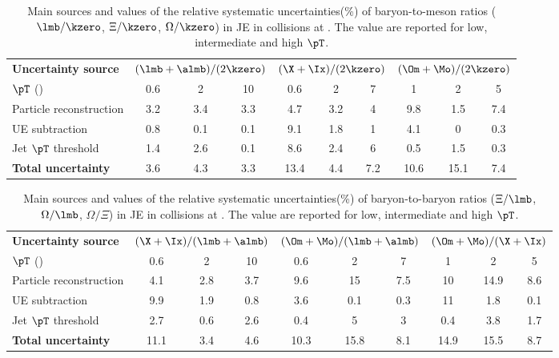 \documentclass[ALICE,manyauthors]{cernphprep}
\begin{document}
\begin{table}[!ht]
	\begin{center}
		\caption{Main sources and values of the relative systematic uncertainties(\%) of baryon-to-meson ratios ($\lmb/\kzero$, $\Xi/\kzero$, $\Omega/\kzero$) in JE in \pPb collisions at \fivenn.
			The value are reported for low, intermediate and high $\pT$.}
		\label{tab:pPbBMRatioUncer}
		\begin{tabularx}{\textwidth}{@{} lCCCCCCCCC @{}}
			\toprule
			\textbf{Uncertainty source} & 
			& 
			&  \\
			\cmidrule(lr){2-4} \cmidrule(lr){5-7} \cmidrule(lr){8-10}
			$\pT$ (\GeVc) & 0.6 & 2 &10  & 0.6 & 2 & 7 & 1 & 2 & 5 \\
			\midrule
			Particle reconstruction& 3.2& 3.4& 3.3& 4.7& 3.2& 4& 9.8& 1.5& 7.4\\
			UE subtraction& 0.8& 0.1& 0.1& 9.1& 1.8& 1& 4.1& 0& 0.3\\
			Jet $\pT$ threshold& 1.4& 2.6& 0.1& 8.6& 2.4& 6& 0.5& 1.5& 0.3\\
			\midrule
			\textbf{Total uncertainty}& 3.6& 4.3& 3.3& 13.4& 4.4& 7.2& 10.6& 15.1& 7.4\\
			\bottomrule
		\end{tabularx}
	\end{center}
\end{table}
\begin{table}[!ht]
	\begin{center}
		\caption{Main sources and values of the relative systematic uncertainties(\%) of baryon-to-baryon ratios ($\Xi/\lmb$, $\Omega/\lmb$, $\Omega/\Xi$) in JE in \pPb collisions at \fivenn.
			The value are reported for low, intermediate and high $\pT$.}
		\label{tab:pPbBBRatioUncer}
		\begin{tabularx}{\textwidth}{@{} lCCCCCCCCC @{}}
			\toprule
			\textbf{Uncertainty source} & 
			& 
			&  \\
			\cmidrule(lr){2-4} \cmidrule(lr){5-7} \cmidrule(lr){8-10}
			$\pT$ (\GeVc) & 0.6 & 2 &10  & 0.6 & 2 & 7 & 1 & 2 & 5 \\
			\midrule
			Particle reconstruction& 4.1& 2.8& 3.7& 9.6& 15& 7.5& 10& 14.9& 8.6\\
			UE subtraction& 9.9& 1.9& 0.8& 3.6& 0.1& 0.3& 11& 1.8& 0.1\\
			Jet $\pT$ threshold& 2.7& 0.6& 2.6& 0.4& 5& 3& 0.4& 3.8& 1.7\\
			\midrule
			\textbf{Total uncertainty}& 11.1& 3.4& 4.6& 10.3& 15.8& 8.1& 14.9& 15.5& 8.7\\
			\bottomrule
		\end{tabularx}
	\end{center}
\end{table}
\end{document}
